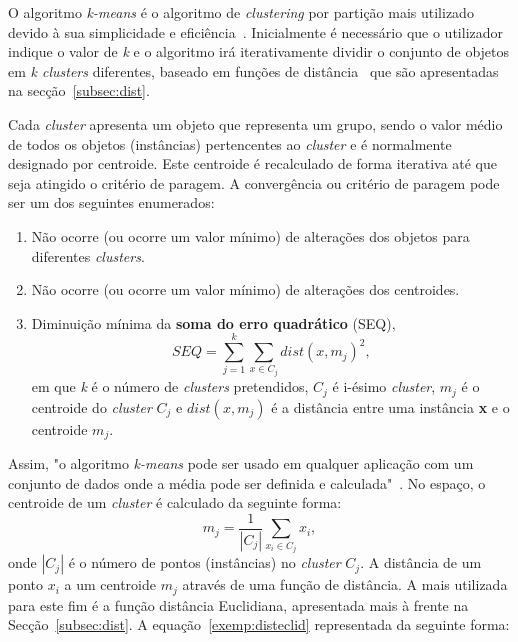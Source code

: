 O algoritmo \textit{k-means} é o algoritmo de \textit{clustering} por partição mais utilizado devido à sua simplicidade e eficiência~\citet{Liu2011}. Inicialmente é necessário que o utilizador indique o valor de \textit{k} e o algoritmo irá iterativamente dividir o conjunto de objetos em \textit{k clusters} diferentes, baseado em funções de distância~\citet{Liu2011} que são apresentadas na secção~\ref{subsec:dist}.

Cada \textit{cluster} apresenta um objeto que representa um grupo, sendo o valor médio de todos os objetos (instâncias) pertencentes ao \textit{cluster} e é normalmente designado por centroide. Este centroide é recalculado de forma iterativa até que seja atingido o critério de paragem. A convergência ou critério de paragem pode ser um dos seguintes enumerados:

\begin{enumerate}
\item Não ocorre (ou ocorre um valor mínimo) de alterações dos objetos para diferentes \textit{clusters}.
\item Não ocorre (ou ocorre um valor mínimo) de alterações dos centroides.
\item Diminuição mínima da \textbf{soma do erro quadrático} (SEQ),
\begin{equation}
SEQ = \sum_{j=1}^{k} \sum_{x \in C_{j} } dist(x, m_{j})^{2} ,
\end{equation}
em que \textit{k} é o número de \textit{clusters} pretendidos, $ C_{j} $ é i-ésimo \textit{cluster}, $ m_{j} $ é o centroide do \textit{cluster} $ C_{j} $ e $ dist(x, m_{j}) $ é a distância entre uma instância \textbf{x} e o centroide $ m_{j} $.
\end{enumerate}

Assim, "o algoritmo \textit{k-means} pode ser usado em qualquer aplicação com um conjunto de dados onde a média pode ser definida e calculada"~\citet{Liu2011}. No espaço, o centroide de um \textit{cluster} é calculado da seguinte forma:
\begin{equation}
m_{j} =  \frac{1}{|C_{j}|} \sum_{x_{i} \in C_{j} }x_{i} ,
\end{equation}
onde $ |C_{j}| $ é o número de pontos (instâncias) no \textit{cluster} $ C_{j} $. A distância de um ponto $ x_{i} $ a um centroide $ m_{j} $ através de uma função de distância. A mais utilizada para este fim é a função distância Euclidiana, apresentada mais à frente na Secção~\ref{subsec:dist}. A equação~\ref{exemp:disteclid} representada da seguinte forma:


